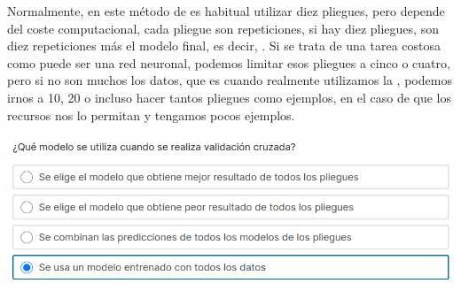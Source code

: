 Normalmente, en este método de  es habitual utilizar diez pliegues, pero depende del coste computacional, cada pliegue son repeticiones, si hay diez pliegues, son diez repeticiones más el modelo final, es decir, . Si se trata de una tarea costosa como puede ser una red neuronal, podemos limitar esos pliegues a cinco o cuatro, pero si no son muchos los datos, que es cuando realmente utilizamos la , podemos irnos a 10, 20 o incluso hacer tantos pliegues como ejemplos, en el caso de que los recursos nos lo permitan y tengamos pocos ejemplos.

\begin{center}
    \includegraphics[scale=.67]{images/mod02-08.png}
\end{center}

